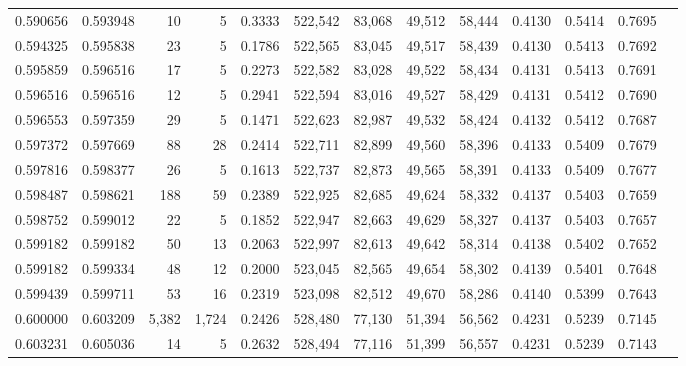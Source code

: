 \begin{tabular}{rrrrrrrrrrrrr}
0.590656 & 0.593948 &     10 &     5 &                                     0.3333 & 522,542 &  83,068 &  49,512 &  58,444 & 0.4130 & 0.5414 & 0.7695 \\
0.594325 & 0.595838 &     23 &     5 &                                     0.1786 & 522,565 &  83,045 &  49,517 &  58,439 & 0.4130 & 0.5413 & 0.7692 \\
0.595859 & 0.596516 &     17 &     5 &                                     0.2273 & 522,582 &  83,028 &  49,522 &  58,434 & 0.4131 & 0.5413 & 0.7691 \\
0.596516 & 0.596516 &     12 &     5 &                                     0.2941 & 522,594 &  83,016 &  49,527 &  58,429 & 0.4131 & 0.5412 & 0.7690 \\
0.596553 & 0.597359 &     29 &     5 &                                     0.1471 & 522,623 &  82,987 &  49,532 &  58,424 & 0.4132 & 0.5412 & 0.7687 \\
0.597372 & 0.597669 &     88 &    28 &                                     0.2414 & 522,711 &  82,899 &  49,560 &  58,396 & 0.4133 & 0.5409 & 0.7679 \\
0.597816 & 0.598377 &     26 &     5 &                                     0.1613 & 522,737 &  82,873 &  49,565 &  58,391 & 0.4133 & 0.5409 & 0.7677 \\
0.598487 & 0.598621 &    188 &    59 &                                     0.2389 & 522,925 &  82,685 &  49,624 &  58,332 & 0.4137 & 0.5403 & 0.7659 \\
0.598752 & 0.599012 &     22 &     5 &                                     0.1852 & 522,947 &  82,663 &  49,629 &  58,327 & 0.4137 & 0.5403 & 0.7657 \\
0.599182 & 0.599182 &     50 &    13 &                                     0.2063 & 522,997 &  82,613 &  49,642 &  58,314 & 0.4138 & 0.5402 & 0.7652 \\
0.599182 & 0.599334 &     48 &    12 &                                     0.2000 & 523,045 &  82,565 &  49,654 &  58,302 & 0.4139 & 0.5401 & 0.7648 \\
0.599439 & 0.599711 &     53 &    16 &                                     0.2319 & 523,098 &  82,512 &  49,670 &  58,286 & 0.4140 & 0.5399 & 0.7643 \\
0.600000 & 0.603209 &  5,382 & 1,724 &                                     0.2426 & 528,480 &  77,130 &  51,394 &  56,562 & 0.4231 & 0.5239 & 0.7145 \\
0.603231 & 0.605036 &     14 &     5 &                                     0.2632 & 528,494 &  77,116 &  51,399 &  56,557 & 0.4231 & 0.5239 & 0.7143 \\

\end{tabular}
